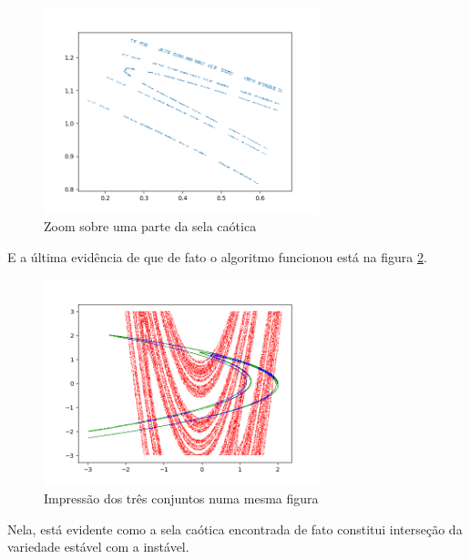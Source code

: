 \documentclass{article}[twocolumn]
\begin{document}
	\begin{figure}[H]
		\centering
		\includegraphics[width=8cm]{hsu/zoom.png}
		\caption{Zoom sobre uma parte da sela ca\'otica}
		\label{fig:hsu_zoom}
	\end{figure}
	E a \'ultima evid\^encia de que de fato o algoritmo funcionou est\'a na figura
	\ref{fig:hsu_inter}.
	\begin{figure}[H]
		\centering
		\includegraphics[width=8cm]{hsu/all.png}
		\caption{Impress\~ao dos tr\^es conjuntos numa mesma figura}
		\label{fig:hsu_inter}
	\end{figure}
	Nela, est\'a evidente como a sela ca\'otica encontrada de fato constitui interse\c{c}\~ao
	da variedade est\'avel com a inst\'avel.
\end{document}
